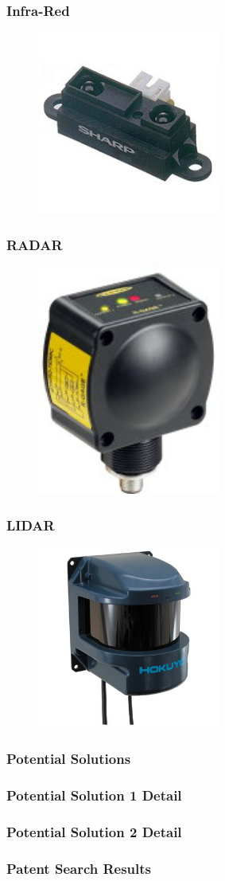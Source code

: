 \documentclass{beamer}
\begin{document}
\begin{frame}
  \frametitle{Infra-Red}
  \begin{figure}
    \centering
    \includegraphics[width=6cm]{ir.jpg}
  \end{figure}
\end{frame}

\begin{frame}
  \frametitle{RADAR}
  \begin{figure}
    \centering
    \includegraphics[width=6cm]{radar.jpg}
  \end{figure}
\end{frame}

\begin{frame}
  \frametitle{LIDAR}
  \begin{figure}
    \centering
    \includegraphics[width=6cm]{laser.jpg}
  \end{figure}
\end{frame}

\begin{frame}
  \frametitle{Potential Solutions}
\end{frame}

\begin{frame}
  \frametitle{Potential Solution 1 Detail}
\end{frame}

\begin{frame}
  \frametitle{Potential Solution 2 Detail}
\end{frame}

\begin{frame}
  \frametitle{Patent Search Results}
\end{frame}
\end{document}
